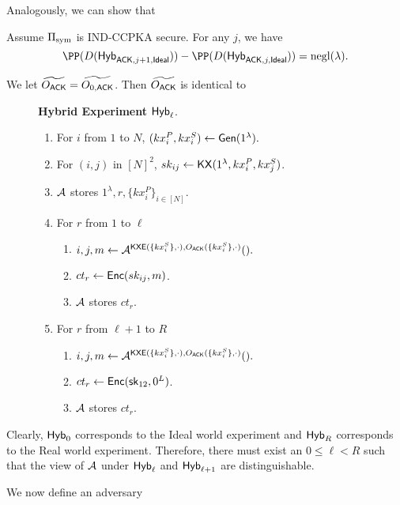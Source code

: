 Analogously, we can show that
\begin{lemma}
    Assume $\Pi_{\text{sym}}$ is IND-CCPKA secure. For any $j$, we have 
    $$\PP(D(\Hyb_{\ACK, j + 1, \Ideal})) - \PP(D(\Hyb_{\ACK, j, \Ideal})) = \negl(\lambda).$$
\end{lemma}
We let $\widetilde{O_{\mathsf{ACK}}} = \widetilde{O_{0, \mathsf{ACK}}}$. Then $\widetilde{O_{\mathsf{ACK}}}$ is identical to 
\begin{figure}[h!]
\begin{framed}
\textbf{Hybrid Experiment} $\mathsf{Hyb}_\ell$.
\begin{enumerate}
    \item For $i$ from $1$ to $N$, $(kx_i^P, kx_i^S) \leftarrow \mathsf{Gen}(1^{\lambda}).$
    \item For $(i, j)$ in $[N]^2$, $sk_{ij} \leftarrow \mathsf{KX}(1^{\lambda}, kx_i^P, kx_j^S)$.
    \item $\mathcal{A}$ stores $1^{\lambda}, r, \{kx_i^P\}_{i \in [N]}$.
    \item For $r$ from $1$ to $\ell$
    \begin{enumerate}
        \item $i, j, m \leftarrow \mathcal{A}^{\mathsf{KXE}(\{kx_i^S\}, \cdot), O_{\mathsf{ACK}}(\{kx_i^S\}, \cdot)}().$
        \item $ct_r \leftarrow \mathsf{Enc}(sk_{ij}, m)$.
        \item $\mathcal{A}$ stores $ct_r$.
    \end{enumerate}
    \item For $r$ from $\ell + 1$ to $R$
    \begin{enumerate}
        \item $i, j, m \leftarrow \mathcal{A}^{\mathsf{KXE}(\{kx_i^S\}, \cdot), O_{\mathsf{ACK}}(\{kx_i^S\}, \cdot)}().$
        \item $ct_r \leftarrow \mathsf{Enc}({\mathsf{sk}}_{12}, 0^{L})$.
        \item $\mathcal{A}$ stores $ct_r$.
    \end{enumerate}
\end{enumerate}
\end{framed}
\end{figure}
Clearly, $\mathsf{Hyb}_0$ corresponds to the Ideal world experiment and $\mathsf{Hyb}_{R}$ corresponds to the Real world experiment. Therefore, there must exist an $0 \leq \ell < R$ such that the view of $\mathcal{A}$ under $\mathsf{Hyb}_{\ell}$ and $\mathsf{Hyb}_{\ell + 1}$ are distinguishable.

We now define an adversary 
\clearpage